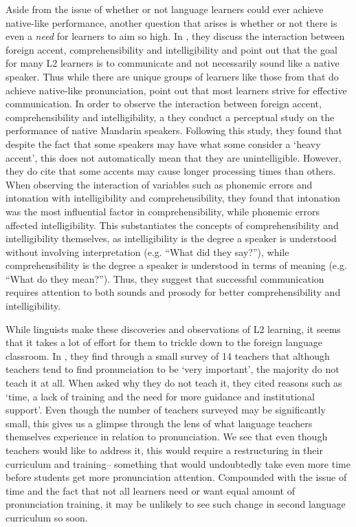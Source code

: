 \documentclass
[
    a4paper,
    twoside,
    12pt,
]
{report}
\begin{document}
Aside from the issue of whether or not language learners could ever
achieve native-like performance, another question that arises is whether
or not there is even a \textit{need} for learners to aim so high. In
\textcite{munro1999}, they discuss the interaction between foreign
accent, comprehensibility and intelligibility and point out that the
goal for many L2 learners is to communicate and not necessarily sound
like a native speaker. Thus while there are unique groups of learners
like those from \textcite{bongaerts1995} that do achieve native-like
pronunciation, \textcite{munro1999} point out that most learners strive
for effective communication. In order to observe the interaction between
foreign accent, comprehensibility and intelligibility, a they conduct a
perceptual study on the performance of native Mandarin speakers.
Following this study, they found that despite the fact that some
speakers may have what some consider a `heavy accent', this does not
automatically mean that they are unintelligible. However, they do cite
that some accents may cause longer processing times than others. When
observing the interaction of variables such as phonemic errors and
intonation with intelligibility and comprehensibility, they found that
intonation was the most influential factor in comprehensibility, while
phonemic errors affected intelligibility. This substantiates the
concepts of comprehensibility and intelligibility themselves, as
intelligibility is the degree a speaker is understood without involving
interpretation (e.g. ``What did they say?''), while comprehensibility is
the degree a speaker is understood in terms of meaning (e.g. ``What do
they mean?''). Thus, they suggest that successful communication requires
attention to both sounds and prosody for better comprehensibility and
intelligibility.

While linguists make these discoveries and observations of L2 learning,
it seems that it takes a lot of effort for them to trickle down to the
foreign language classroom. In \textcite{darcy2012}, they find through a
small survey of 14 teachers that although teachers tend to find
pronunciation to be `very important', the majority do not teach it at
all. When asked why they do not teach it, they cited reasons such as
`time, a lack of training and the need for more guidance and
institutional support'. Even though the number of teachers surveyed may
be significantly small, this gives us a glimpse through the lens of what
language teachers themselves experience in relation to pronunciation. We
see that even though teachers would like to address it, this would
require a restructuring in their curriculum and training-- something
that would undoubtedly take even more time before students get more
pronunciation attention. Compounded with the issue of time and the fact
that not all learners need or want equal amount of pronunciation
training, it may be unlikely to see such change in second language
curriculum so soon.
\end{document}
